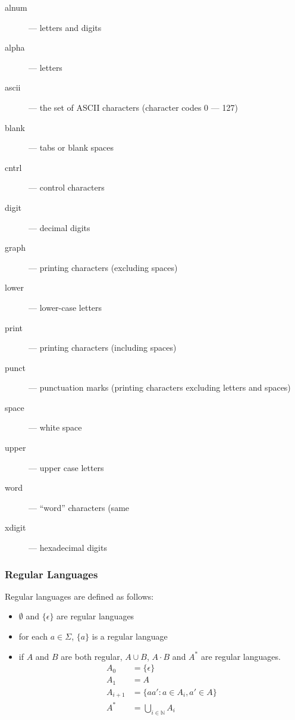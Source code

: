 \begin{description}

\item[alnum] --- letters and digits

\item[alpha] --- letters

\item[ascii] --- the set of ASCII characters (character codes 0 --- 127)

\item[blank] --- tabs or blank spaces

\item[cntrl] --- control characters

\item[digit] --- decimal digits

\item[graph] --- printing characters (excluding spaces)

\item[lower] --- lower-case letters

\item[print] --- printing characters (including spaces)

\item[punct] --- punctuation marks (printing characters excluding letters and spaces)

\item[space] --- white space

\item[upper] --- upper case letters

\item[word] --- ``word'' characters (same

\item[xdigit] --- hexadecimal digits

\end{description}
\subsubsection{Regular Languages}
Regular languages are defined as follows:
\begin{itemize}
\item $\emptyset$ and $\{\epsilon\}$ are regular languages
\item for each $a\in\Sigma$, $\{a\}$ is a regular language
\item if $A$ and $B$ are both regular, $A\cup B$, $A\cdot B$ and $A^*$ are regular languages.
\begin{align*}
    A_0&=\{\epsilon\}\\
    A_1&= A\\
    A_{i+1} &= \{ aa' : a \in A_i, a'\in A\}\\
    A^* &= \bigcup_{i\in\mathbb N} A_i
\end{align*}
\end{itemize}

